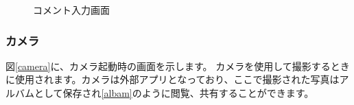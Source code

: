 \documentclass[a4j]{jarticle}
\begin{document}
\begin{figure}[H]
    \begin{center}
    \caption {コメント入力画面}
    \label{Comment}
    \end{center}
\end{figure}


\subsubsection{カメラ}
図\ref{camera}に、カメラ起動時の画面を示します。
カメラを使用して撮影するときに使用されます。カメラは外部アプリとなっており、ここで撮影された写真はアルバムとして保存され\ref{albam}のように閲覧、共有することができます。
\end{document}
